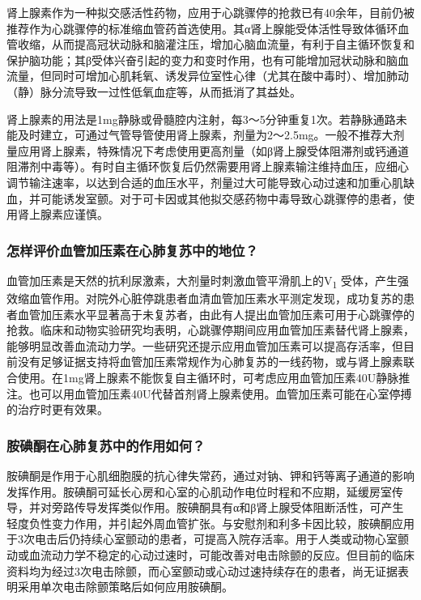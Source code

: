 肾上腺素作为一种拟交感活性药物，应用于心跳骤停的抢救已有40余年，目前仍被推荐作为心跳骤停的标准缩血管药首选使用。其α肾上腺能受体活性导致体循环血管收缩，从而提高冠状动脉和脑灌注压，增加心脑血流量，有利于自主循环恢复和保护脑功能；其β受体兴奋引起的变力和变时作用，也有可能增加冠状动脉和脑血流量，但同时可增加心肌耗氧、诱发异位室性心律（尤其在酸中毒时）、增加肺动（静）脉分流导致一过性低氧血症等，从而抵消了其益处。

肾上腺素的用法是1mg静脉或骨髓腔内注射，每3～5分钟重复1次。若静脉通路未能及时建立，可通过气管导管使用肾上腺素，剂量为2～2.5mg。一般不推荐大剂量应用肾上腺素，特殊情况下考虑使用更高剂量（如β肾上腺受体阻滞剂或钙通道阻滞剂中毒等）。有时自主循环恢复后仍然需要用肾上腺素输注维持血压，应细心调节输注速率，以达到合适的血压水平，剂量过大可能导致心动过速和加重心肌缺血，并可能诱发室颤。对于可卡因或其他拟交感药物中毒导致心跳骤停的患者，使用肾上腺素应谨慎。

\subsubsection{怎样评价血管加压素在心肺复苏中的地位？}

血管加压素是天然的抗利尿激素，大剂量时刺激血管平滑肌上的V\textsubscript{1}
受体，产生强效缩血管作用。对院外心脏停跳患者血清血管加压素水平测定发现，成功复苏的患者血管加压素水平显著高于未复苏者，由此有人提出血管加压素可用于心跳骤停的抢救。临床和动物实验研究均表明，心跳骤停期间应用血管加压素替代肾上腺素，能够明显改善血流动力学。一些研究还提示应用血管加压素可以提高存活率，但目前没有足够证据支持将血管加压素常规作为心肺复苏的一线药物，或与肾上腺素联合使用。在1mg肾上腺素不能恢复自主循环时，可考虑应用血管加压素40U静脉推注。也可以用血管加压素40U代替首剂肾上腺素使用。血管加压素可能在心室停搏的治疗时更有效果。

\subsubsection{胺碘酮在心肺复苏中的作用如何？}

胺碘酮是作用于心肌细胞膜的抗心律失常药，通过对钠、钾和钙等离子通道的影响发挥作用。胺碘酮可延长心房和心室的心肌动作电位时程和不应期，延缓房室传导，并对旁路传导发挥类似作用。胺碘酮具有α和β肾上腺受体阻断活性，可产生轻度负性变力作用，并引起外周血管扩张。与安慰剂和利多卡因比较，胺碘酮应用于3次电击后仍持续心室颤动的患者，可提高入院存活率。用于人类或动物心室颤动或血流动力学不稳定的心动过速时，可能改善对电击除颤的反应。但目前的临床资料均为经过3次电击除颤，而心室颤动或心动过速持续存在的患者，尚无证据表明采用单次电击除颤策略后如何应用胺碘酮。

